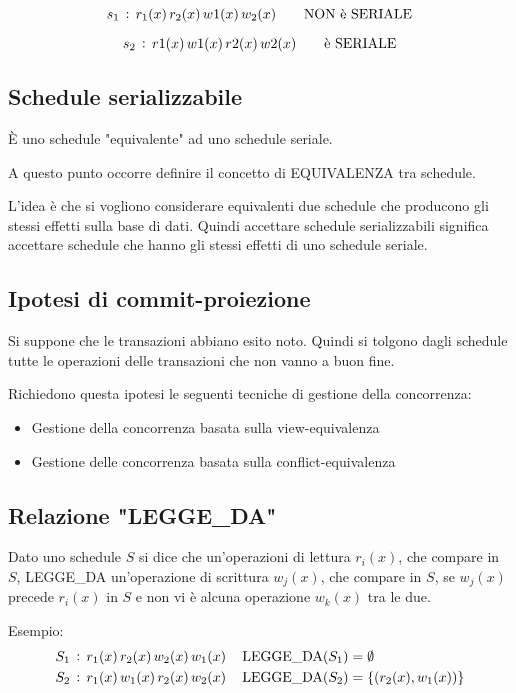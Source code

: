 \documentclass[a4paper, 10pt]{article}
\theoremstyle{definition}
\begin{document}
			\[
				s_1\, : \, r_1(x) \, r_2(x) \, w1(x) \, w_2(x) \quad \quad \textup{NON è SERIALE}
			\]
			
			\[
				s_2\, : \, r1(x) \, w1(x) \, r2(x) \, w2(x) \quad \quad \textup{è SERIALE}
			\]
			
		\subsection{Schedule serializzabile}
			È uno schedule "equivalente" ad uno schedule seriale.
			
			A questo punto occorre definire il concetto di EQUIVALENZA
			tra schedule.
			
			L'idea è che si vogliono considerare equivalenti due schedule
			che producono gli stessi effetti sulla base di dati.
			Quindi accettare schedule serializzabili significa accettare
			schedule che hanno gli stessi effetti di uno schedule seriale.
			
		\subsection*{Ipotesi di commit-proiezione}
			Si suppone che le transazioni abbiano esito noto. Quindi si
			tolgono dagli schedule tutte le operazioni delle transazioni che
			non vanno a buon fine.
			
			Richiedono questa ipotesi le seguenti tecniche di gestione della
			concorrenza:
			\begin{itemize}
				\item Gestione della concorrenza basata sulla view-equivalenza
				\item Gestione delle concorrenza basata sulla conflict-equivalenza
			\end{itemize}

		\subsection*{Relazione "LEGGE\_DA"}
			Dato uno schedule $ S $ si dice che un'operazioni di lettura $ r_i (x) $,
			che compare in $ S $, LEGGE\_DA un'operazione di scrittura
			$ w_j(x) $, che compare in $ S $, se $ w_j(x) $ precede $ r_i(x) $ in $ S $ e non vi
			è alcuna operazione $ w_k(x) $ tra le due.

			Esempio:
			\begin{align*}
					S_1 \, & : \, r_1(x) \, r_2(x) \, w_2(x) \, w_1(x) \, \quad \textup{LEGGE\_DA}(S_1) = \emptyset \\
					S_2 \, & : \, r_1(x) \, w_1(x) \, r_2(x) \, w_2(x) \, \quad \textup{LEGGE\_DA}(S_2) = \{(r_2(x), w_1(x))\} 
			\end{align*}
\end{document}
